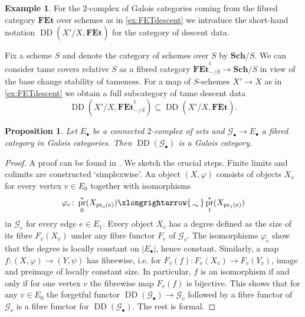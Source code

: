 \documentclass[a4paper,twoside,11pt,reqno]{amsart}
\newcommand{\cG}{{\mathcal G}}
\newcommand{\isomto}{\xlongrightarrow{\,\smash{\raisebox{-0.65ex} 
    {\ensuremath{\displaystyle\sim}}}\,}}
\DeclareMathOperator{\pr}{pr}
\newcommand{\cat}[1]{\mathbf{#1}}
\newcommand{\FEt}{\cat{F\acute{E}t}}
\newcommand{\Sch}{\cat{Sch}}
\newcommand{\ph}{\varphi}
\newcommand{\FEtt}{{\cat{F\acute{E}t}}^{\!\mathrm{t}}}
\DeclareMathOperator{\Desc}{DD}
\newtheorem{prop}[thm]{Proposition}
\theoremstyle{definition}
\newtheorem{ex}[thm]{Example}
\numberwithin{equation}{subsection}
\begin{document}
\begin{ex}
For the $2$-complex of Galois categories coming from the fibred category $\FEt$ over schemes as in \cref{ex:FETdescent} we introduce the short-hand notation $\Desc(X'/X, \FEt)$ for the category of descent data. 

Fix a scheme $S$ and denote the category of schemes over $S$ by $\Sch/S$. We can consider tame covers relative $S$ as a fibred category $\FEtt_{-/S} \to \Sch/S$ in view of the base change stability of tameness. 
For a map of $S$-schemes $X'\to X$ as in \cref{ex:FETdescent} we obtain a full subcategory of tame descent data
\[
    \Desc(X'/X, \FEtt_{-/S}) \subseteq \Desc(X'/X, \FEt).
\]
\end{ex}

\begin{prop}
\label{prop:DD is galois for connected E}
    Let $E_\bullet$ be a connected $2$-complex of sets and $\cG_\bullet \to E_\bullet$ a fibred category in Galois categories. Then $\Desc(\cG_\bullet)$ is a Galois category.
\end{prop}

\begin{proof}
    A proof can be found in 
    \cite[Propositions~2.4,~4.4]{Stix2006:vanKampen}. We sketch the crucial steps. Finite limits and colimits are constructed `simplexwise'.  
    An object $(X,\ph)$ consists of objects $X_v$ for every vertex $v \in E_0$ together with isomorphisms 
    \[
    \ph_e\colon  \pr_0^\ast(X_{\pr_0(e)}) \isomto \pr_1^\ast(X_{\pr_1(e)})
    \]
    in $\cG_e$ for every edge $e \in E_1$. Every object $X_v$ has a degree defined as the size of its fibre $F_v(X_v)$ under any fibre functor $F_v$ of $\cG_v$. The isomorphisms $\ph_e$ show that the degree is locally constant on $|E_\bullet|$, hence constant. Similarly, a map $f \colon (X,\ph) \to (Y, \psi)$ has fibrewise, i.e. for $F_v(f) \colon F_v(X_v) \to F_v(Y_v)$, image and preimage of locally constant size. In particular, $f$ is an isomorphism if and only if for one vertex $v$ the fibrewise map $F_v(f)$ is bijective. This shows that for any $v \in E_0$ the forgetful functor $\Desc(\cG_\bullet) \to \cG_v$ followed by a fibre functor of $\cG_v$ is a fibre functor for $\Desc(\cG_\bullet)$. The rest is formal. 
\end{proof}
\end{document}
